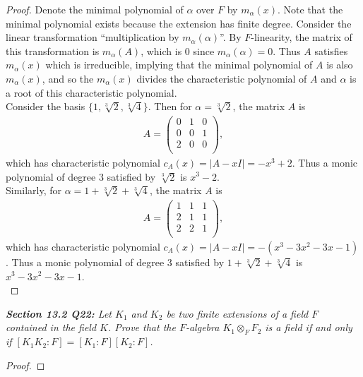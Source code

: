 \documentclass{article}
\begin{document}
  \begin{proof}
    Denote the minimal polynomial of $\alpha$ over $F$ by $m_\alpha(x)$.
    Note that the minimal polynomial exists because the extension has
    finite degree. Consider the linear transformation ``multiplication by
    $m_\alpha(\alpha)$''. By $F$-linearity, the matrix of this
    transformation is $m_\alpha(A)$, which is 0 since $m_\alpha(\alpha)=0$.
    Thus $A$ satisfies $m_\alpha(x)$ which is irreducible, implying that
    the minimal polynomial of $A$ is also $m_\alpha(x)$, and so the
    $m_\alpha(x)$ divides the characteristic polynomial of $A$ and $\alpha$
    is a root of this characteristic polynomial. \\

    Consider the basis $\{1,\sqrt[3]{2},\sqrt[3]{4}\}$. Then for
    $\alpha=\sqrt[3]{2}$, the matrix $A$ is
    \begin{align*}
      A =
      \begin{pmatrix}
        0&1&0\\
        0&0&1\\
        2&0&0\\
      \end{pmatrix},
    \end{align*}
    which has characteristic polynomial $c_A(x)=|A-xI|=-x^3+2$. Thus a
    monic polynomial of degree 3 satisfied by $\sqrt[3]{2}$ is $x^3-2$. \\

    Similarly, for $\alpha=1+\sqrt[3]{2}+\sqrt[3]{4}$, the matrix $A$ is
    \begin{align*}
      A =
      \begin{pmatrix}
        1&1&1\\
        2&1&1\\
        2&2&1\\
      \end{pmatrix},
    \end{align*}
    which has characteristic polynomial $c_A(x)=|A-xI|=-(x^3-3x^2-3x-1)$.
    Thus a monic polynomial of degree 3 satisfied by
    $1+\sqrt[3]{2}+\sqrt[3]{4}$ is $x^3-3x^2-3x-1$. \\
  \end{proof}

\it \textbf{Section 13.2 Q22:} Let $K_1$ and $K_2$ be two finite extensions
  of a field $F$ contained in the field $K$. Prove that the $F$-algebra
  $K_1\otimes_F F_2$ is a field if and only if $[K_1K_2:F]=[K_1:F][K_2:F]$.

  \begin{proof}
  \end{proof}
\end{document}
